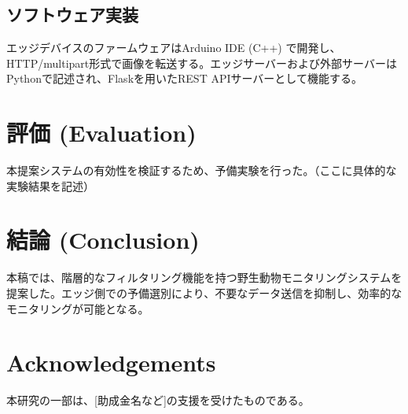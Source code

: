 \documentclass[twocolumn,a4paper]{article}
\begin{document}
\subsection{ソフトウェア実装}
エッジデバイスのファームウェアはArduino IDE (C++) で開発し、HTTP/multipart形式で画像を転送する。エッジサーバーおよび外部サーバーはPythonで記述され、Flaskを用いたREST APIサーバーとして機能する。

\section{評価 (Evaluation)}
本提案システムの有効性を検証するため、予備実験を行った。（ここに具体的な実験結果を記述）

\section{結論 (Conclusion)}
本稿では、階層的なフィルタリング機能を持つ野生動物モニタリングシステムを提案した。エッジ側での予備選別により、不要なデータ送信を抑制し、効率的なモニタリングが可能となる。

\section*{\sc Acknowledgements}
本研究の一部は、[助成金名など]の支援を受けたものである。

\footnotesize



\end{document}
